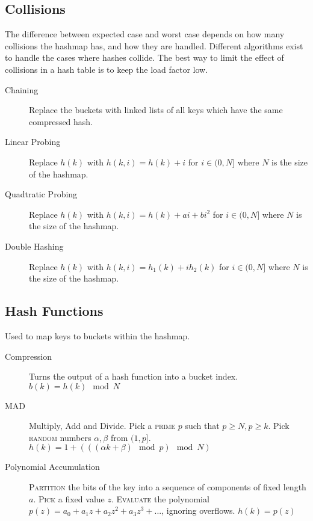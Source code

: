 \documentclass[landscape]{cheat}
\begin{document}
\begin{multicols}{3}
\subsection{Collisions}
The difference between expected case and worst case depends on how many collisions the hashmap has, and how they are handled.
Different algorithms exist to handle the cases where hashes collide.
The best way to limit the effect of collisions in a hash table is to keep the load factor low.
\begin{description}
    \item[Chaining] Replace the buckets with linked lists of all keys which have the same compressed hash.
    \item[Linear Probing] Replace $h(k)$ with $h(k, i) = h(k) + i$ for $i \in (0,N]$ where $N$ is the size of the hashmap.
    \item[Quadtratic Probing] Replace $h(k)$ with $h(k, i) = h(k) + ai + bi^2$ for $i \in (0,N]$ where $N$ is the size of the hashmap.
    \item[Double Hashing] Replace $h(k)$ with $h(k, i) = h_1(k) + ih_2(k)$ for $i \in (0,N]$ where $N$ is the size of the hashmap.
\end{description}

\subsection{Hash Functions}
Used to map keys to buckets within the hashmap.
\begin{description}
    \item[Compression] Turns the output of a hash function into a bucket index.
        $b(k) = h(k) \mod N$
    \item[MAD] Multiply, Add and Divide.
        Pick a \textsc{prime} $p$ such that $p \geq N, p \geq k$.
        Pick \textsc{random} numbers $\alpha, \beta$ from $(1, p]$.
        $h(k) = 1 + (((\alpha k + \beta) \mod p) \mod N)$
    \item[Polynomial Accumulation] \textsc{Partition} the bits of the key into a sequence of components of fixed length $a$.
        \textsc{Pick} a fixed value $z$.
        \textsc{Evaluate} the polynomial $p(z) = a_0 + a_1z + a_2z^2 + a_3z^3+...$, ignoring overflows.
        $h(k) = p(z)$

\end{description}


\end{multicols}
\end{document}
